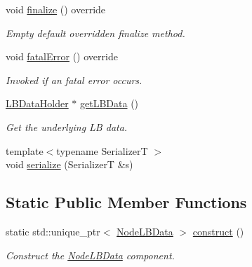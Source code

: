 \begin{DoxyCompactItemize}
void \hyperlink{structvt_1_1vrt_1_1collection_1_1balance_1_1_node_l_b_data_ac62cac77080f79e73e303c42ad850155}{finalize} () override
\begin{DoxyCompactList}\small\item\em Empty default overridden finalize method. \end{DoxyCompactList}\item 
void \hyperlink{structvt_1_1vrt_1_1collection_1_1balance_1_1_node_l_b_data_aefbc8058f2d74c3dd6c903e9bfefe0d2}{fatal\+Error} () override
\begin{DoxyCompactList}\small\item\em Invoked if an fatal error occurs. \end{DoxyCompactList}\item 
\hyperlink{structvt_1_1vrt_1_1collection_1_1balance_1_1_l_b_data_holder}{L\+B\+Data\+Holder} $\ast$ \hyperlink{structvt_1_1vrt_1_1collection_1_1balance_1_1_node_l_b_data_aa67707482afa83dfa96910ac42337ef0}{get\+L\+B\+Data} ()
\begin{DoxyCompactList}\small\item\em Get the underlying LB data. \end{DoxyCompactList}\item 
{\footnotesize template$<$typename SerializerT $>$ }\\void \hyperlink{structvt_1_1vrt_1_1collection_1_1balance_1_1_node_l_b_data_aa6b20e4b1920e9294fb8b933dcd8a35b}{serialize} (SerializerT \&s)
\end{DoxyCompactItemize}
\subsection*{Static Public Member Functions}
\begin{DoxyCompactItemize}
\item 
static std\+::unique\+\_\+ptr$<$ \hyperlink{structvt_1_1vrt_1_1collection_1_1balance_1_1_node_l_b_data}{Node\+L\+B\+Data} $>$ \hyperlink{structvt_1_1vrt_1_1collection_1_1balance_1_1_node_l_b_data_a8c75ad477772cebf032e7c3664d2e62c}{construct} ()
\begin{DoxyCompactList}\small\item\em Construct the \hyperlink{structvt_1_1vrt_1_1collection_1_1balance_1_1_node_l_b_data}{Node\+L\+B\+Data} component. \end{DoxyCompactList}\end{DoxyCompactItemize}
